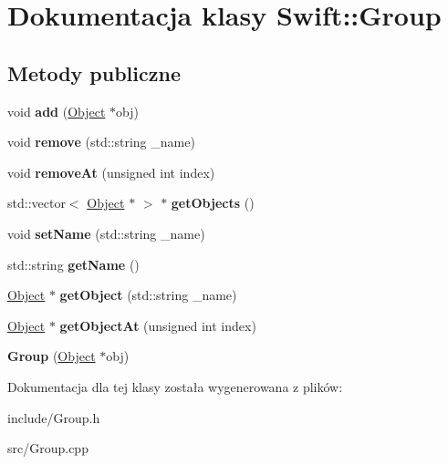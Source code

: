 \hypertarget{class_swift_1_1_group}{\section{Dokumentacja klasy Swift\-:\-:Group}
\label{class_swift_1_1_group}
}
\subsection*{Metody publiczne}
\begin{DoxyCompactItemize}
\item 
\hypertarget{class_swift_1_1_group_afce53738ef8d6f6e5d175efb9732aae9}{void {\bfseries add} (\hyperlink{class_swift_1_1_object}{Object} $\ast$obj)}\label{class_swift_1_1_group_afce53738ef8d6f6e5d175efb9732aae9}

\item 
\hypertarget{class_swift_1_1_group_a69675968ef7a0aff30b9bde563c4c049}{void {\bfseries remove} (std\-::string \-\_\-name)}\label{class_swift_1_1_group_a69675968ef7a0aff30b9bde563c4c049}

\item 
\hypertarget{class_swift_1_1_group_ae2e53956668341cde2e1f54143f9934b}{void {\bfseries remove\-At} (unsigned int index)}\label{class_swift_1_1_group_ae2e53956668341cde2e1f54143f9934b}

\item 
\hypertarget{class_swift_1_1_group_a8003af9fcc0277b6c7b6d55573f6aa6c}{std\-::vector$<$ \hyperlink{class_swift_1_1_object}{Object} $\ast$ $>$ $\ast$ {\bfseries get\-Objects} ()}\label{class_swift_1_1_group_a8003af9fcc0277b6c7b6d55573f6aa6c}

\item 
\hypertarget{class_swift_1_1_group_ae4fc910a6f9382bed12e2d76bb51c3fe}{void {\bfseries set\-Name} (std\-::string \-\_\-name)}\label{class_swift_1_1_group_ae4fc910a6f9382bed12e2d76bb51c3fe}

\item 
\hypertarget{class_swift_1_1_group_a6228adf834b941c85cdb780229150af8}{std\-::string {\bfseries get\-Name} ()}\label{class_swift_1_1_group_a6228adf834b941c85cdb780229150af8}

\item 
\hypertarget{class_swift_1_1_group_ae454e92e2b6bd7bbcd868a0a2a02eff7}{\hyperlink{class_swift_1_1_object}{Object} $\ast$ {\bfseries get\-Object} (std\-::string \-\_\-name)}\label{class_swift_1_1_group_ae454e92e2b6bd7bbcd868a0a2a02eff7}

\item 
\hypertarget{class_swift_1_1_group_a7bce81ad79cd9c9198c74b6a18437c07}{\hyperlink{class_swift_1_1_object}{Object} $\ast$ {\bfseries get\-Object\-At} (unsigned int index)}\label{class_swift_1_1_group_a7bce81ad79cd9c9198c74b6a18437c07}

\item 
\hypertarget{class_swift_1_1_group_a56c2ddd378894060b15038159ec0e08d}{{\bfseries Group} (\hyperlink{class_swift_1_1_object}{Object} $\ast$obj)}\label{class_swift_1_1_group_a56c2ddd378894060b15038159ec0e08d}

\end{DoxyCompactItemize}


Dokumentacja dla tej klasy została wygenerowana z plików\-:\begin{DoxyCompactItemize}
\item 
include/Group.\-h\item 
src/Group.\-cpp\end{DoxyCompactItemize}
